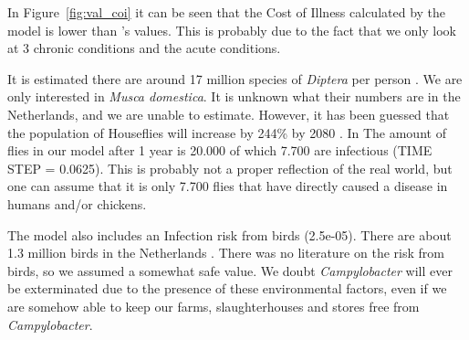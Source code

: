 In Figure~\ref{fig:val_coi} it can be seen that the Cost of Illness calculated by the model is lower than \citeauthor{mangen_campylobacteriosis_2007}'s values. This is probably due to the fact that we only look at 3 chronic conditions and the acute conditions. 

It is estimated there are around 17 million species of \textit{Diptera} per person \parencite{gorman_trillions_2017}. We are only interested in \textit{Musca domestica}. It is unknown what their numbers are in the Netherlands, and we are unable to estimate. However, it has been guessed that the population of Houseflies will increase by 244\% by 2080 \parencite{mcalister_secret_2017}. In The amount of flies in our model after 1 year is 20.000 of which 7.700 are infectious (TIME STEP = 0.0625). This is probably not a proper reflection of the real world, but one can assume that it is only 7.700 flies that have directly caused a disease in humans and/or chickens.

The model also includes an Infection risk from birds (2.5e-05). There are about 1.3 million birds in the Netherlands \parencite{noauthor_miljoenen_2019}. There was no literature on the risk from birds, so we assumed a somewhat safe value. We doubt \textit{Campylobacter} will ever be exterminated due to the presence of these environmental factors, even if we are somehow able to keep our farms, slaughterhouses and stores free from \textit{Campylobacter}.




